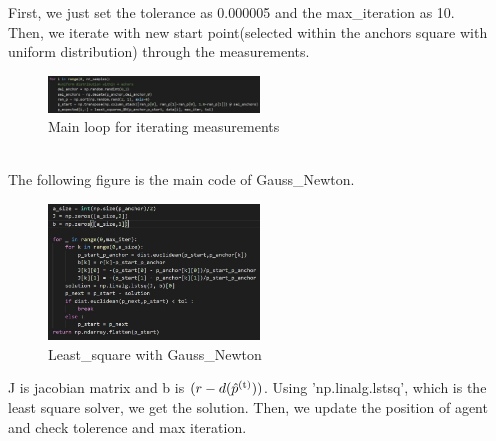 \documentclass[a4paper]{article}
\begin{document}
First, we just set the tolerance as 0.000005 and the max\_iteration as 10.\\
Then, we iterate with new start point(selected within the anchors square with uniform distribution) through the measurements.
\begin{figure}[h]
	\begin{center}
		\includegraphics[width=0.5\textwidth]{gauss_newton.jpg}
		\caption{Main loop for iterating measurements}
	\end{center}
\end{figure}\\
The following figure is the main code of Gauss\_Newton.\\
\begin{figure}[h]
	\begin{center}
		\includegraphics[width=0.5\textwidth]{least_square.jpg}
		\caption{Least\_square with Gauss\_Newton}
	\end{center}
\end{figure}

J is jacobian matrix and b is $(r-d(\hat{p}\textsuperscript{(t)}))$.
Using 'np.linalg.lstsq', which is the least square solver, we get the solution. Then, we update the position of agent and check tolerence and max iteration.

\clearpage
\end{document}
